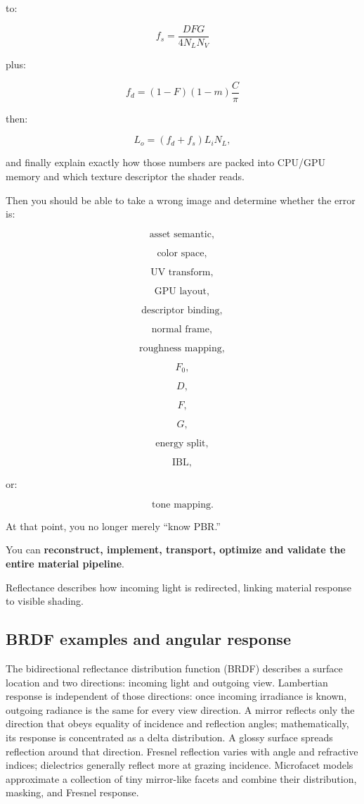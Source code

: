 to:

\[
f_s=
\frac{DFG}{4N_LN_V}
\]

plus:

\[
f_d=
(1-F)(1-m)\frac{C}{\pi}
\]

then:

\[
L_o=
(f_d+f_s)L_iN_L,
\]

and finally explain exactly how those numbers are packed into CPU/GPU memory and which texture descriptor the shader reads.

Then you should be able to take a wrong image and determine whether the error is:

\[
\text{asset semantic},
\]

\[
\text{color space},
\]

\[
\text{UV transform},
\]

\[
\text{GPU layout},
\]

\[
\text{descriptor binding},
\]

\[
\text{normal frame},
\]

\[
\text{roughness mapping},
\]

\[
F_0,
\]

\[
D,
\]

\[
F,
\]

\[
G,
\]

\[
\text{energy split},
\]

\[
\text{IBL},
\]

or:

\[
\text{tone mapping}.
\]

At that point, you no longer merely ``know PBR.''

You can \textbf{reconstruct, implement, transport, optimize and validate the entire material pipeline}.

Reflectance describes how incoming light is redirected, linking material response to visible shading.

\subsection{BRDF examples and angular response}\label{03-visual-computing-i-ch006-brdf-examples-and-angular-response}

The bidirectional reflectance distribution function (BRDF) describes a surface location and two directions: incoming light and outgoing view. Lambertian response is independent of those directions: once incoming irradiance is known, outgoing radiance is the same for every view direction. A mirror reflects only the direction that obeys equality of incidence and reflection angles; mathematically, its response is concentrated as a delta distribution. A glossy surface spreads reflection around that direction. Fresnel reflection varies with angle and refractive indices; dielectrics generally reflect more at grazing incidence. Microfacet models approximate a collection of tiny mirror-like facets and combine their distribution, masking, and Fresnel response.

